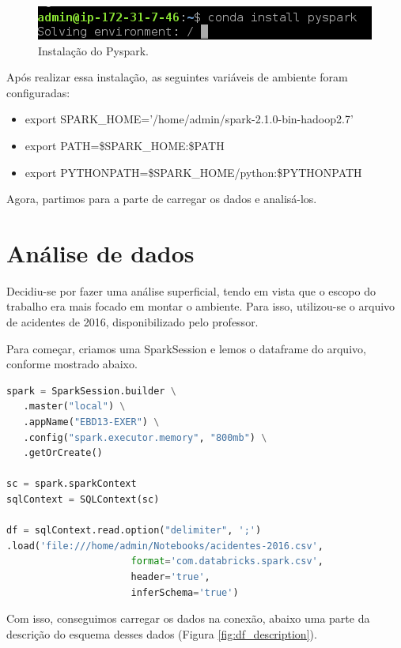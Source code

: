\documentclass{article}
\begin{document}
\begin{figure}[h]
  \includegraphics[width=\linewidth]{img/install_pyspark.png}
  \caption{Instalação do Pyspark.}
  \label{fig:pyspark_install}
\end{figure}

Após realizar essa instalação, as seguintes variáveis de ambiente foram configuradas:

\begin{itemize}
    \item export SPARK\_HOME='/home/admin/spark-2.1.0-bin-hadoop2.7'
    \item export PATH=\$SPARK\_HOME:\$PATH
    \item export PYTHONPATH=\$SPARK\_HOME/python:\$PYTHONPATH
\end{itemize}

Agora, partimos para a parte de carregar os dados e analisá-los.



\section{Análise de dados}

Decidiu-se por fazer uma análise superficial, tendo em vista que o escopo do trabalho era mais focado em montar o ambiente. Para isso, utilizou-se o arquivo de acidentes de 2016, disponibilizado pelo professor.

Para começar, criamos uma SparkSession e lemos o dataframe do arquivo, conforme mostrado abaixo.

\begin{lstlisting}[language=Python]
spark = SparkSession.builder \
   .master("local") \
   .appName("EBD13-EXER") \
   .config("spark.executor.memory", "800mb") \
   .getOrCreate()
   
sc = spark.sparkContext
sqlContext = SQLContext(sc)

df = sqlContext.read.option("delimiter", ';')
.load('file:///home/admin/Notebooks/acidentes-2016.csv', 
                      format='com.databricks.spark.csv', 
                      header='true', 
                      inferSchema='true')
\end{lstlisting}

Com isso, conseguimos carregar os dados na conexão, abaixo uma parte da descrição do esquema desses dados (Figura \ref{fig:df_description}).
\end{document}
